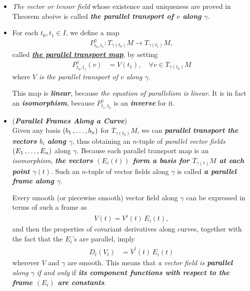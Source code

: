 \documentclass[11pt]{article}
\begin{document}
\begin{itemize}
\item \begin{remark}
\emph{The vector or tensor field} whose existence and uniqueness are proved in Theorem aboive is called \emph{\textbf{the parallel transport of $v$ along $\gamma$}}.
\end{remark}

\item \begin{definition}
For each $t_0, t_1 \in I$, we define a map 
\begin{align}
P^{\gamma}_{t_0, t_1}: T_{\gamma(t_0)}M \rightarrow T_{\gamma(t_1)}M,  \label{eqn: parallel_transport_map}
\end{align} called \underline{\emph{\textbf{the parallel transport map}}}, by setting 
\begin{align*}
P^{\gamma}_{t_0, t_1}(v) &= V(t_1), \quad \forall v \in T_{\gamma(t_0)}M
\end{align*} where \emph{$V$ is the parallel transport of $v$ along $\gamma$}. 

This map is \emph{\textbf{linear}}, because \emph{the equation of parallelism is linear}. It is in fact an \emph{\textbf{isomorphism}}, because $P^{\gamma}_{t_1, t_0}$ is an \emph{\textbf{inverse}} for it.
\end{definition}

\item \begin{remark} (\emph{\textbf{Parallel Frames Along a Curve}})\\
Given any basis $(b_1 \,{,}\ldots{,}\, b_n)$ for $T_{\gamma(t_0)}M$, we can \emph{\textbf{parallel transport the vectors $b_i$ along $\gamma$}}, thus obtaining an $n$-tuple of \emph{parallel vector fields} $(E_1 \,{,}\ldots{,}\, E_n)$  along $\gamma$. Because each parallel transport map is an \emph{isomorphism}, \emph{\textbf{the vectors $(E_i(t))$ form a basis for $T_{\gamma(t)}M$ at each point $\gamma(t)$}}. Such an $n$-tuple of vector fields along $\gamma$ is called \emph{\textbf{a
parallel frame along $\gamma$}}.

Every smooth (or piecewise smooth) vector field along $\gamma$ can be expressed in terms of such a frame as 
\begin{align*}
V(t) = V^i(t)\, E_i(t),
\end{align*} and then the properties of covariant derivatives along curves, together with the fact that the $E_i$'s are parallel,
imply
\begin{align}
D_t(V_t) &= \dot{V}^i(t)\, E_i(t)  \label{eqn: parallel_transport_basis_vector_fields}
\end{align} wherever $V$ and $\gamma$ are smooth. This means that \emph{a vector field is \textbf{parallel} along $\gamma$} \emph{if and only} if \emph{\textbf{its component functions with respect to the frame $(E_i)$ are constants}}.
\end{remark}


\end{itemize}
\end{document}
